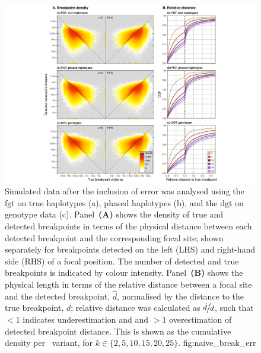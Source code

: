 

\begin{figure}[p]
\includegraphics[width=\textwidth]{./img/ch4/break_naive_err}
{Simulated data after the inclusion of error was analysed using the \gls{fgt} on true haplotypes (a), phased haplotypes (b), and the \gls{dgt} on genotype data (c).
Panel~\textbf{(A)} shows the density of true and detected breakpoints in terms of the physical distance between each detected breakpoint and the corresponding focal site; shown separately for breakpoints detected on the left (LHS) and right-hand side (RHS) of a focal position.
The number of detected and true breakpoints is indicated by colour intensity.
Panel~\textbf{(B)} shows the physical length in terms of the relative distance between a focal site and the detected breakpoint, $\hat{d}$, normalised by the distance to the true breakpoint, $d$; \ie relative distance was calculated as $\large \sfrac{\hat{d}}{d}$, such that $<1$ indicates underestimation and and $>1$ overestimation of detected breakpoint distance.
This is shown as the cumulative density per \fk{}~variant, for ${k \in \{2, 5, 10, 15, 20, 25\}}$.}
{fig:naive_break_err}
\end{figure}
